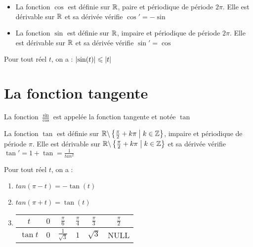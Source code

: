 \begin{prop}
	\begin{itemize}
		\item La fonction \(\cos\) est définie sur \(\mathbb{R}\), paire et périodique de période \(2\pi\). Elle est dérivable sur \(\mathbb{R}\) et sa dérivée vérifie \(\cos' = -\sin\)
		\item La fonction \(\sin\) est définie sur \(\mathbb{R}\), impaire et périodique de période \(2\pi\). Elle est dérivable sur \(\mathbb{R}\) et sa dérivée vérifie \(\sin' = \cos\)
	\end{itemize}
\end{prop}

\begin{prop}
	Pour tout réel \(t\), on a : \(\left\lvert\sin(t)\right\rvert \leqslant \left\lvert t\right\rvert\)
\end{prop}

\section{La fonction tangente}
\begin{defi}
	La fonction \(\frac{\sin}{\cos} \) est appelée la fonction tangente et notée \(\tan\)
\end{defi}

\begin{prop}
	La fonction \(\tan\) est définie sur \(\mathbb{R}\backslash\left\lbrace\frac{\pi}{2}+k\pi\;\middle|\; k\in \mathbb{Z}\right\rbrace\), impaire et périodique de période \(\pi\). Elle est dérivable sur \(\mathbb{R}\backslash\left\lbrace\frac{\pi}{2}+k\pi\;\middle|\; k\in \mathbb{Z}\right\rbrace\) et sa dérivée vérifie \(\tan' = 1+\tan = \frac{1}{tan^2}\)
\end{prop}

\begin{formu}
	Pour tout réel \(t\), on a :
	\begin{enumerate}
        \item \(tan(\pi-t) = -\tan(t)\)
        \item \(tan(\pi+t) = \tan(t) \)
        \item \begin{tabular}{|c|c|c|c|c|c|}

		\hline
		\(t\)       & \(0\) & \(\frac{\pi}{6}\)      & \(\frac{\pi}{4}\)      & \(\frac{\pi}{3}\)       & \(\frac{\pi}{2}\) \\
		\hline
		\(\tan t \) & \(0\) & \(\frac{1}{\sqrt{3}}\) & \(1\) & \(\sqrt{3}\)       & NULL             \\
		\hline
	\end{tabular}
    \end{enumerate}
\end{formu}

